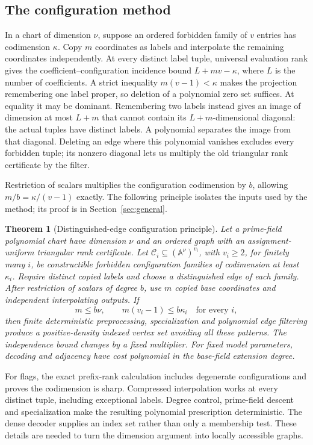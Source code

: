 \documentclass[11pt,a4paper]{article}
\newcommand{\A}{\mathbb A}
\newcommand{\Ccal}{\mathcal C}
\newtheorem{theorem}{Theorem}[section]
\theoremstyle{definition}
\theoremstyle{remark}
\numberwithin{equation}{section}
\begin{document}
\subsection{The configuration method}
In a chart of dimension $\nu$, suppose an ordered forbidden family of $v$ entries has codimension $\kappa$. Copy $m$ coordinates as labels and interpolate the remaining coordinates independently. At every distinct label tuple, universal evaluation rank gives the coefficient--configuration incidence bound $L+mv-\kappa$, where $L$ is the number of coefficients. A strict inequality $m(v-1)<\kappa$ makes the projection remembering one label proper, so deletion of a polynomial zero set suffices. At equality it may be dominant. Remembering two labels instead gives an image of dimension at most $L+m$ that cannot contain its $L+m$-dimensional diagonal: the actual tuples have distinct labels. A polynomial separates the image from that diagonal. Deleting an edge where this polynomial vanishes excludes every forbidden tuple; its nonzero diagonal lets us multiply the old triangular rank certificate by the filter.

Restriction of scalars multiplies the configuration codimension by $b$, allowing $m/b=\kappa/(v-1)$ exactly. The following principle isolates the inputs used by the method; its proof is in Section~\ref{sec:general}.

\begin{theorem}[Distinguished-edge configuration principle]\label{thm:configuration}
Let a prime-field polynomial chart have dimension $\nu$ and an ordered graph with an assignment-uniform triangular rank certificate. Let $\Ccal_i\subseteq(\A^\nu)^{v_i}$, with $v_i\ge2$, for finitely many $i$, be constructible forbidden configuration families of codimension at least $\kappa_i$. Require distinct copied labels and choose a distinguished edge of each family. After restriction of scalars of degree $b$, use $m$ copied base coordinates and independent interpolating outputs. If
\[
m\le b\nu,\qquad m(v_i-1)\le b\kappa_i\quad\text{for every }i,
\]
then finite deterministic preprocessing, specialization and polynomial edge filtering produce a positive-density indexed vertex set avoiding all these patterns. The independence bound changes by a fixed multiplier. For fixed model parameters, decoding and adjacency have cost polynomial in the base-field extension degree.
\end{theorem}

For flags, the exact prefix-rank calculation includes degenerate configurations and proves the codimension is sharp. Compressed interpolation works at every distinct tuple, including exceptional labels. Degree control, prime-field descent and specialization make the resulting polynomial prescription deterministic. The dense decoder supplies an index set rather than only a membership test. These details are needed to turn the dimension argument into locally accessible graphs.
\end{document}
